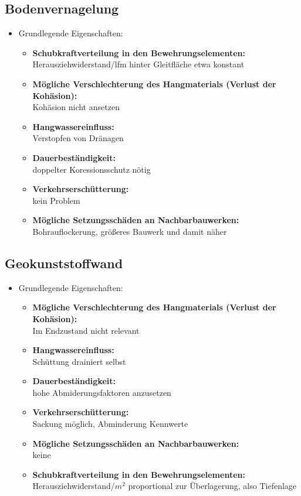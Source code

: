 \documentclass[fleqn,twoside]{article}
\begin{document}
\subsection{Bodenvernagelung}
\begin{itemize}
    \item{Grundlegende Eigenschaften:}
    \begin{itemize}
        \item \textbf{Schubkraftverteilung in den Bewehrungselementen:} \\Herausziehwiderstand/lfm hinter Gleitfläche etwa konstant
        \item \textbf{Mögliche Verschlechterung des Hangmaterials (Verlust der Kohäsion):} \\Kohäsion nicht ansetzen
        \item \textbf{Hangwassereinfluss:} \\Verstopfen von Dränagen
        \item \textbf{Dauerbeständigkeit:} \\doppelter Koressionsschutz nötig
        \item \textbf{Verkehrserschütterung:} \\kein Problem
        \item \textbf{Mögliche Setzungsschäden an Nachbarbauwerken:} \\Bohrauflockerung, größeres Bauwerk und damit näher
    \end{itemize}
\end{itemize}


\subsection{Geokunststoffwand}
\begin{itemize}
    \item{Grundlegende Eigenschaften:}
    \begin{itemize}
        \item \textbf{Mögliche Verschlechterung des Hangmaterials (Verlust der Kohäsion):} \\Im Endzustand nicht relevant
        \item \textbf{Hangwassereinfluss:} \\Schüttung drainiert selbst
        \item \textbf{Dauerbeständigkeit:} \\hohe Abmiderungsfaktoren anzusetzen
        \item \textbf{Verkehrserschütterung:} \\Sackung möglich, Abminderung Kennwerte
        \item \textbf{Mögliche Setzungsschäden an Nachbarbauwerken:} \\keine
        \item \textbf{Schubkraftverteilung in den Bewehrungselementen:} \\Herausziehwiderstand/$m^2$ proportional zur Überlagerung, also Tiefenlage
    \end{itemize}
\end{itemize}
\end{document}
